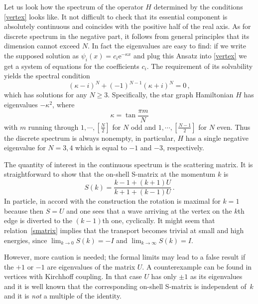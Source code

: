 \documentclass[english]{elsarticle}
\begin{document}
Let us look how the spectrum of the operator $H$ determined by the conditions \eqref{vertex} looks like. It not difficult to check that its essential component is absolutely continuous and coincides with the positive half of the real axis. As for discrete spectrum in the negative part, it follows from general principles that its dimension cannot exceed $N$. In fact the eigenvalues are easy to find: if we write the supposed solution as $\psi_i(x) = c_i \mathrm{e}^{-\kappa x}$ and plug this Ansatz into \eqref{vertex} we get a system of equations for the coefficients $c_i$. The requirement of its solvability yields the spectral condition
\[ %
(\kappa-i)^N + (-1)^{N-1} (\kappa+i)^N = 0\,,
\] %
which has solutions for any $N\ge 3$. Specifically, the star graph Hamiltonian $H$ has eigenvalues $-\kappa^2$, where
\begin{equation} \label{bs_ev}
\kappa= \tan \frac{\pi m}{N}
\end{equation}
with $m$ running through $1,\cdots,[\frac{N}{2}]$ for $N$ odd and $1,\cdots,[\frac{N-1}{2}]$ for $N$ even. Thus the discrete spectrum is always nonempty, in particular, $H$ has a single negative eigenvalue for $N=3,4$ which is equal to $-1$ and $-3$, respectively.

The quantity of interest in the continuous spectrum is the scattering matrix. It is straightforward to show \cite{BK13} that the on-shell S-matrix at the momentum $k$ is
\begin{equation} \label{smatrix}
S(k) = \frac{k-1 +(k+1)U}{k+1 +(k-1)U}\,.
\end{equation}
In particle, in accord with the construction the rotation is maximal for $k=1$ because then $S=U$ and one sees that a wave arriving at the vertex on the $k$th edge is diverted to the $(k-1)$th one, cyclically. It might seem that relation~\eqref{smatrix} implies that the transport becomes trivial at small and high energies, since $\lim_{k\to 0} S(k)=-I$ and $\lim_{k\to\infty} S(k)=I$.

However, more caution is needed; the formal limits may lead to a false result if the  $+1$ or $-1$ are eigenvalues of the matrix $U$. A counterexample can be found in vertices with Kirchhoff coupling. In that case $U$ has only $\pm 1$ as its eigenvalues and it is well known that the corresponding on-shell S-matrix is independent of~$k$ and it is \emph{not} a multiple of the identity.
\end{document}

